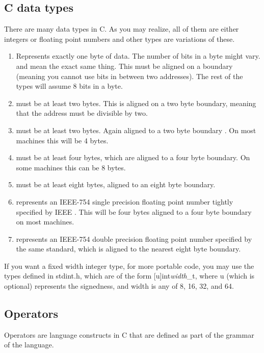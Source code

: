 \subsection{C data types}

There are many data types in C. As you may realize, all of them are either integers or floating point numbers and other types are variations of these.

\begin{enumerate}
	\item {} Represents exactly one byte of data. The number of bits in a byte might vary.  and  mean the exact same thing. This must be aligned on a boundary (meaning you cannot use bits in between two addresses). The rest of the types will assume 8 bits in a byte.
	\item {} must be at least two bytes. This is aligned on a two byte boundary, meaning that the address must be divisible by two.
	\item {} must be at least two bytes. Again aligned to a two byte boundary \cite[P. 34]{ISON1124}. On most machines this will be 4 bytes.
	\item {} must be at least four bytes, which are aligned to a four byte boundary. On some machines this can be 8 bytes.
	\item {} must be at least eight bytes, aligned to an eight byte boundary.
	\item {} represents an IEEE-754 single precision floating point number tightly specified by IEEE \cite{4610935}. This will be four bytes aligned to a four byte boundary on most machines.
	\item {} represents an IEEE-754 double precision floating point number specified by the same standard, which is aligned to the nearest eight byte boundary.
\end{enumerate}

If you want a fixed width integer type, for more portable code, you may use the types defined in stdint.h, which are of the form [u]int\emph{width}\_t, where u (which is optional) represents the signedness, and width is any of 8, 16, 32, and 64.

\subsection{Operators}

Operators are language constructs in C that are defined as part of the grammar of the language.

